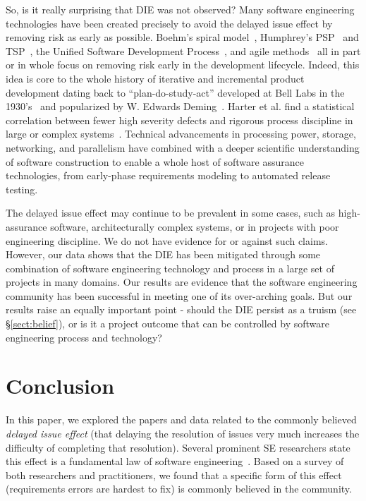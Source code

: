 \documentclass[smallcondensed]{svjour3}
\begin{document}
So, is it really surprising that DIE was not observed? Many software engineering technologies have been created precisely to avoid the delayed issue effect by removing risk as early as possible. Boehm's spiral model~\cite{boehm1988spiral}, Humphrey's PSP~\cite{humphrey1995discipline} and TSP~\cite{tsp00}, the Unified Software Development Process~\cite{jacobson1999unified}, and agile methods~\cite{Beck2001a} all in part or in whole focus on removing risk early in the development lifecycle. Indeed, this idea is core to the whole history of iterative and incremental product development dating back to ``plan-do-study-act'' developed at Bell Labs in the 1930's~\cite{larman2003iterative} and popularized by W. Edwards Deming~\cite{deming1986out}. Harter et al. find a statistical correlation between fewer high severity defects and rigorous process discipline in large or complex systems~\cite{harter2012does}. Technical advancements in processing power, storage, networking, and parallelism have combined with a deeper scientific understanding of software construction to enable a whole host of software assurance technologies, from early-phase requirements modeling to automated release testing.

The delayed issue effect may continue to be prevalent in some cases, such as high-assurance software, architecturally complex systems, or in projects with poor engineering discipline. We do not have evidence for or against such claims. However, our data shows that the DIE has been mitigated through some combination of software engineering technology and process in a large set of projects in many domains. Our results are evidence that the software engineering community has been successful in meeting one of its over-arching goals. But our results raise an equally important point - should the DIE persist as a truism (see \S\ref{sect:belief}), or is it a project outcome that can be controlled by software engineering process and technology?
 
 
 \section{Conclusion}
 \label{sect:conclusion}
 
In this paper, we explored   the papers and data related to the 
commonly believed {\em delayed issue effect} (that delaying the resolution of issues
very much 
increases the difficulty of completing that  resolution).
Several prominent SE researchers state this effect is a fundamental law of software engineering~\cite{mcconnell01,boehm01,glass02}.
Based on a  survey  of both researchers and practitioners, we  found that
a specific form  of this effect (requirements errors are hardest to fix) is  commonly believed in the community.  
\end{document}
